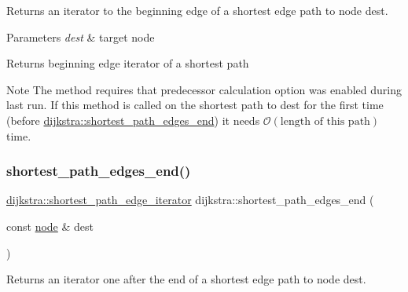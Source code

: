 Returns an iterator to the beginning edge of a shortest edge path to node {\ttfamily dest}. 


\begin{DoxyParams}{Parameters}
{\em dest} & target node\\
\hline
\end{DoxyParams}
\begin{DoxyReturn}{Returns}
beginning edge iterator of a shortest path
\end{DoxyReturn}
\begin{DoxyNote}{Note}
The method requires that predecessor calculation option was enabled during last run. If this method is called on the shortest path to {\ttfamily dest} for the first time (before \mbox{\hyperlink{classdijkstra_a031e6fef10aa40aad10edc1053ad9cf0}{dijkstra\+::shortest\+\_\+path\+\_\+edges\+\_\+end}}) it needs $\mathcal{O}(\mbox{length of this path})$ time. 
\end{DoxyNote}
\mbox{\label{classdijkstra_a031e6fef10aa40aad10edc1053ad9cf0}} 
\subsubsection{\texorpdfstring{shortest\+\_\+path\+\_\+edges\+\_\+end()}{shortest\_path\_edges\_end()}}
{\footnotesize\ttfamily \mbox{\hyperlink{classdijkstra_ad35d95d4ed7a4202a5d048a63aa115b9}{dijkstra\+::shortest\+\_\+path\+\_\+edge\+\_\+iterator}} dijkstra\+::shortest\+\_\+path\+\_\+edges\+\_\+end (\begin{DoxyParamCaption}\item[{const \mbox{\hyperlink{classnode}{node}} \&}]{dest }\end{DoxyParamCaption})}



Returns an iterator one after the end of a shortest edge path to node {\ttfamily dest}. 


